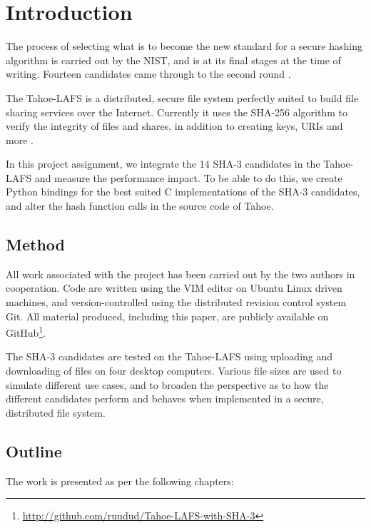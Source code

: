 \documentclass[english,12pt,a4paper]{book}
\begin{document}
\chapter{Introduction}
\setcounter{page}{1}

The process of selecting what is to become the new standard for a secure hashing
algorithm is carried out by the {NIST}, and is at its final stages at the time
of writing. Fourteen candidates came through to the second round
\cite{s_nistround2}.

The Tahoe-\ac{LAFS} is a distributed, secure file system perfectly suited to
build file sharing services over the Internet. Currently it uses the
\ac{SHA}-256 algorithm to verify the integrity of files and shares, in addition
to creating keys, \ac{URI}s and more \cite{t_tahoe}.

In this project assignment, we integrate the 14 \ac{SHA}-3 candidates in
the Tahoe-\ac{LAFS} and measure the performance impact. To be able to do this,
we create Python bindings for the best suited C implementations of the SHA-3
candidates, and alter the hash function calls in the source code of Tahoe.

\section{Method}

All work associated with the project has been carried out by the two authors in
cooperation. Code are written using the VIM editor on Ubuntu Linux
driven machines, and version-controlled using the distributed revision control
system Git. All material produced, including this paper, are publicly available
on GitHub\footnote{\url{http://github.com/ruudud/Tahoe-LAFS-with-SHA-3}}.

The \ac{SHA}-3 candidates are tested on the Tahoe-\ac{LAFS} using uploading and
downloading of files on four desktop computers. Various file sizes are used to
simulate different use cases, and to broaden the perspective as to how the
different candidates perform and behaves when implemented in a secure,
distributed file system.

\section{Outline}

The work is presented as per the following chapters:
\end{document}
